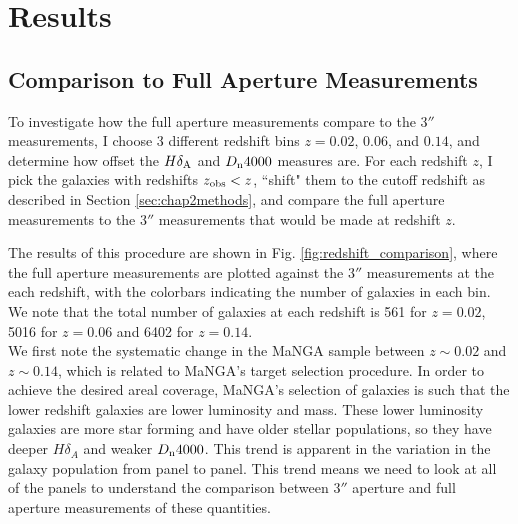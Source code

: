 \section{Results}
\subsection{Comparison to Full Aperture Measurements}

To investigate how the full aperture measurements compare to the 3$''$ 
measurements, I choose 3 different redshift bins $z = 0.02$, $0.06$, 
and $0.14$, and determine how offset the $H\delta_{\rm A}$ and 
$D_{\rm n}4000$ measures are. For each redshift $z$, I pick the galaxies 
with redshifts $z_{\rm obs} < z$, ``shift" them to the cutoff 
redshift as described in Section \ref{sec:chap2methods}, 
and compare the full aperture measurements to the 3$''$
measurements that would be made at redshift $z$. 

The results of this procedure are shown in 
Fig. \ref{fig:redshift_comparison}, where the full 
aperture measurements are plotted against the 3$''$ measurements at 
the each redshift, with the colorbars indicating the number of galaxies 
in each bin. We note that the total number of galaxies at each redshift 
is 561 for $z = 0.02$, 5016 for $z = 0.06$ and 6402 for $z = 0.14$.\\

We first note the systematic change in the MaNGA sample between $z\sim 0.02$
and $z\sim 0.14$, which is related to MaNGA's target selection procedure. 
In order to achieve the desired areal coverage, MaNGA's selection
of galaxies is such that the lower redshift galaxies are lower luminosity
and mass. These lower luminosity galaxies are more star forming and have
older stellar populations, so they have deeper $H\delta_{A}$ and weaker 
$D_{\rm n} 4000$. This trend is apparent in the variation in the galaxy
population from panel to panel. This trend means we need to look at all
of the panels to understand the comparison between $3''$ aperture and full
aperture measurements of these quantities.

